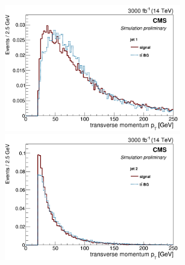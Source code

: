 \documentclass[10pt,a4paper]{article}
\newcommand{\ww}{7.7cm} %
\begin{document}
\begin{figure}[h]
	
  \begin{subfigure}[b]{17cm}
    \begin{minipage}[h!]{\ww}
      \centering
      \includegraphics[width=\ww]{figs/jet1Pt.png}
    \end{minipage}
    \begin{minipage}[h!]{\ww}
      \centering
      \includegraphics[width=\ww]{figs/jet2Pt.png}
    \end{minipage}
  \end{subfigure}


\end{figure}
\end{document}
